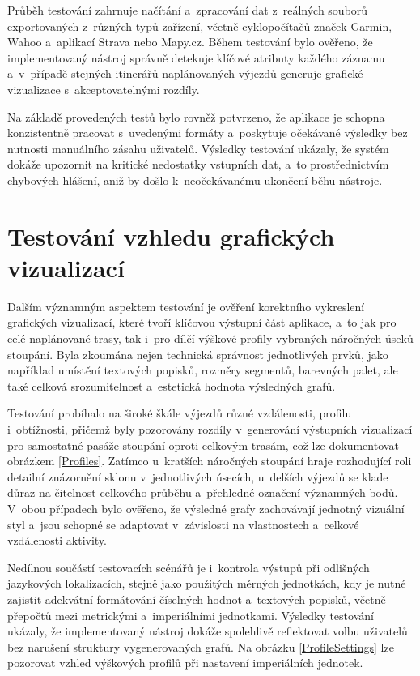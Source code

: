 Průběh testování zahrnuje načítání a~zpracování dat z~reálných souborů exportovaných z~různých typů zařízení, včetně cyklopočítačů značek Garmin, Wahoo a~aplikací Strava nebo Mapy.cz.
Během testování bylo ověřeno, že implementovaný nástroj správně detekuje klíčové atributy každého záznamu a~v~případě stejných itinerářů naplánovaných výjezdů generuje grafické vizualizace s~akceptovatelnými rozdíly.

Na základě provedených testů bylo rovněž potvrzeno, že aplikace je schopna konzistentně pracovat s~uvedenými formáty a~poskytuje očekávané výsledky bez nutnosti manuálního zásahu uživatelů.
Výsledky testování ukázaly, že systém dokáže upozornit na kritické nedostatky vstupních dat, a~to prostřednictvím chybových hlášení, aniž by došlo k~neočekávanému ukončení běhu nástroje.

\section{Testování vzhledu grafických vizualizací}
\label{testing-the-appearance-of-graphical-visualizations}

Dalším významným aspektem testování je ověření korektního vykreslení grafických vizualizací, které tvoří klíčovou výstupní část aplikace, a~to jak pro celé naplánované trasy, tak i~pro dílčí výškové profily vybraných náročných úseků stoupání.
Byla zkoumána nejen technická správnost jednotlivých prvků, jako například umístění textových popisků, rozměry segmentů, barevných palet, ale také celková srozumitelnost a~estetická hodnota výsledných grafů.

Testování probíhalo na široké škále výjezdů různé vzdálenosti, profilu i~obtížnosti, přičemž byly pozorovány rozdíly v~generování výstupních vizualizací pro samostatné pasáže stoupání oproti celkovým trasám, což lze dokumentovat obrázkem \ref{Profiles}.
Zatímco u~kratších náročných stoupání hraje rozhodující roli detailní znázornění sklonu v~jednotlivých úsecích, u~delších výjezdů se klade důraz na čitelnost celkového průběhu a~přehledné označení významných bodů.
V~obou případech bylo ověřeno, že výsledné grafy zachovávají jednotný vizuální styl a~jsou schopné se adaptovat v~závislosti na vlastnostech a~celkové vzdálenosti aktivity.

Nedílnou součástí testovacích scénářů je i~kontrola výstupů při odlišných jazykových lokalizacích, stejně jako použitých měrných jednotkách, kdy je nutné zajistit adekvátní formátování číselných hodnot a~textových popisků, včetně přepočtů mezi metrickými a~imperiálními jednotkami.
Výsledky testování ukázaly, že implementovaný nástroj dokáže spolehlivě reflektovat volbu uživatelů bez narušení struktury vygenerovaných grafů.
Na obrázku \ref{ProfileSettings} lze pozorovat vzhled výškových profilů při nastavení imperiálních jednotek.

